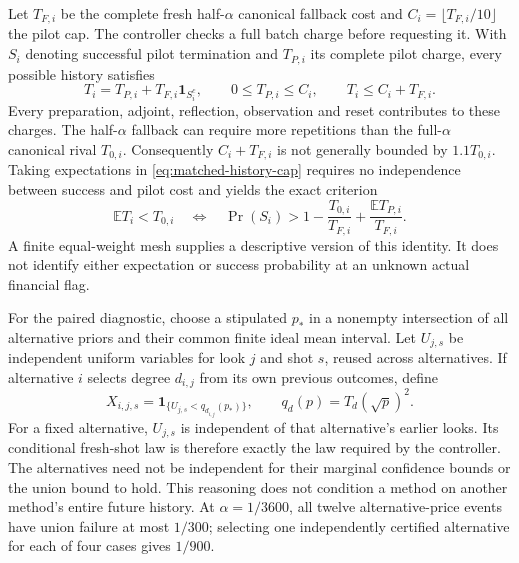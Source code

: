 \documentclass[11pt]{article}
\begin{document}
Let $T_{F,i}$ be the complete fresh half-$\alpha$ canonical fallback
cost and $C_i=\lfloor T_{F,i}/10\rfloor$ the pilot cap. The controller
checks a full batch charge before requesting it. With $S_i$ denoting
successful pilot termination and $T_{P,i}$ its complete pilot charge,
every possible history satisfies
\begin{equation}
 T_i=T_{P,i}+T_{F,i}\mathbf1_{S_i^c},
 \qquad 0\leq T_{P,i}\leq C_i,
 \qquad T_i\leq C_i+T_{F,i}.
 \label{eq:matched-history-cap}
\end{equation}
Every preparation, adjoint, reflection, observation and reset contributes
to these charges. The half-$\alpha$ fallback can require more repetitions
than the full-$\alpha$ canonical rival $T_{0,i}$. Consequently
$C_i+T_{F,i}$ is not generally bounded by $1.1T_{0,i}$.
Taking expectations in \eqref{eq:matched-history-cap} requires no
independence between success and pilot cost and yields the exact criterion
\begin{equation}
 \mathbb E T_i<T_{0,i}
 \quad\Longleftrightarrow\quad
 \Pr(S_i)>1-\frac{T_{0,i}}{T_{F,i}}
                 +\frac{\mathbb E T_{P,i}}{T_{F,i}}.
 \label{eq:matched-break-even}
\end{equation}
A finite equal-weight mesh supplies a descriptive version of this
identity. It does not identify either expectation or success probability
at an unknown actual financial flag.

For the paired diagnostic, choose a stipulated $p_*$ in a nonempty
intersection of all alternative priors and their common finite ideal
mean interval. Let $U_{j,s}$ be independent uniform variables for
look $j$ and shot $s$, reused across alternatives. If alternative $i$
selects degree $d_{i,j}$ from its own previous outcomes, define
\begin{equation}
 X_{i,j,s}=\mathbf1_{\{U_{j,s}<q_{d_{i,j}}(p_*)\}},
 \qquad
 q_d(p)=T_d(\sqrt p)^2.
 \label{eq:matched-paired-uniforms}
\end{equation}
For a fixed alternative, $U_{j,s}$ is independent of that alternative's
earlier looks. Its conditional fresh-shot law is therefore exactly the
law required by the controller. The alternatives need not be independent
for their marginal confidence bounds or the union bound to hold.
This reasoning does not condition a method on another method's entire
future history. At $\alpha=1/3600$, all twelve alternative-price
events have union failure at most $1/300$; selecting one independently
certified alternative for each of four cases gives $1/900$.
\end{document}
